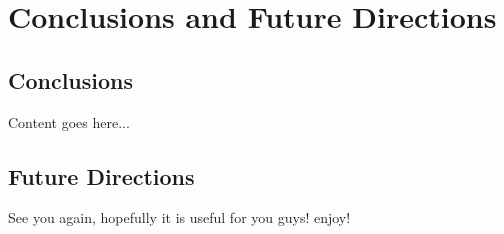 \chapter{Conclusions and Future Directions}
\label{chap:conclsn}

\section{Conclusions}
Content goes here... 

\section{Future Directions}
See you again, hopefully it is useful for you guys! enjoy!
